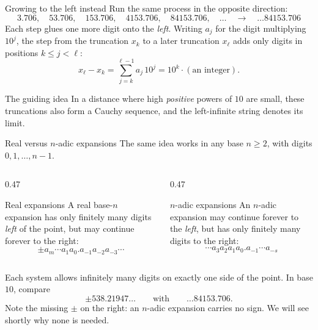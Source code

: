 \documentclass[aspectratio=169,11pt]{beamer}
\begin{document}
\begin{frame}{Growing to the left instead}
  Run the same process in the opposite direction:
  \[
    3.706,\quad
    53.706,\quad
    153.706,\quad
    4153.706,\quad
    84153.706,\quad\ldots
    \quad\longrightarrow\quad
    \ldots84153.706
  \]
  Each step glues one more digit onto the \emph{left}.  Writing \(a_j\)
  for the digit multiplying \(10^j\), the step from the truncation
  \(x_k\) to a later truncation \(x_\ell\) adds only digits in positions
  \(k\le j<\ell\):
  \[
    x_\ell-x_k
      =\sum_{j=k}^{\ell-1}a_j\,10^j
      =10^k\cdot(\text{an integer}).
  \]

  \begin{alertblock}{The guiding idea}
    In a distance where high \emph{positive} powers of \(10\) are small,
    these truncations also form a Cauchy sequence, and the left-infinite
    string denotes its limit.
  \end{alertblock}
\end{frame}

\begin{frame}{Real versus \(n\)-adic expansions}
  The same idea works in any base \(n\ge2\), with digits
  \(0,1,\ldots,n-1\).

  \begin{columns}[T,onlytextwidth]
    \begin{column}{0.47\textwidth}
      \begin{block}{Real expansions}
        A real base-\(n\) expansion has only finitely many digits
        \emph{left} of the point, but may continue forever to the right:
        \[
          \pm a_m\cdots a_1a_0
          .a_{-1}a_{-2}a_{-3}\cdots
        \]
      \end{block}
    \end{column}
    \begin{column}{0.47\textwidth}
      \begin{alertblock}{\(n\)-adic expansions}
        An \(n\)-adic expansion may continue forever to the
        \emph{left}, but has only finitely many digits to the right:
        \[
          \cdots a_3a_2a_1a_0
          .a_{-1}\cdots a_{-s}
        \]
      \end{alertblock}
    \end{column}
  \end{columns}

  Each system allows infinitely many digits on exactly one side of the
  point.  In base \(10\), compare
  \[
    \pm538.21947\ldots
    \qquad\text{with}\qquad
    \ldots84153.706.
  \]
  Note the missing \(\pm\) on the right: an \(n\)-adic expansion carries
  no sign.  We will see shortly why none is needed.
\end{frame}
\end{document}
